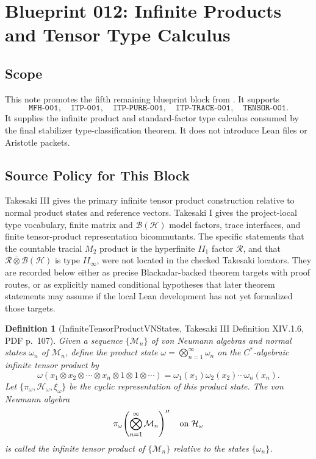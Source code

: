 \documentclass{article}
\newtheorem{definition}{Definition}
\newcommand{\cB}{\mathcal B}
\newcommand{\cH}{\mathcal H}
\newcommand{\cM}{\mathcal M}
\newcommand{\cR}{\mathcal R}
\begin{document}
\section*{Blueprint 012: Infinite Products and Tensor Type Calculus}

\subsection*{Scope}

This note promotes the fifth remaining blueprint block from
.  It supports
\[
  \texttt{MFH-001},\quad
  \texttt{ITP-001},\quad
  \texttt{ITP-PURE-001},\quad
  \texttt{ITP-TRACE-001},\quad
  \texttt{TENSOR-001}.
\]
It supplies the infinite product and standard-factor type calculus consumed by
the final stabilizer type-classification theorem.  It does not introduce Lean
files or Aristotle packets.

\subsection*{Source Policy for This Block}

Takesaki III gives the primary infinite tensor product construction relative to
normal product states and reference vectors.  Takesaki I gives the project-local
type vocabulary, finite matrix and \(\cB(\cH)\) model factors, trace
interfaces, and finite tensor-product representation bicommutants.  The
specific statements that the countable tracial \(M_2\) product is the
hyperfinite \(II_1\) factor \(\cR\), and that
\(\cR\bar\otimes \cB(\cH)\) is type \(II_\infty\), were not located in the
checked Takesaki locators.  They are recorded below either as precise
Blackadar-backed theorem targets with proof routes, or as explicitly named
conditional hypotheses that later theorem statements may assume if the local
Lean development has not yet formalized those targets.

\begin{definition}[InfiniteTensorProductVNStates, Takesaki III Definition XIV.1.6, PDF p.~107]
Given a sequence \(\{\cM_n\}\) of von Neumann algebras and normal states
\(\omega_n\) of \(\cM_n\), define the product state
\(\omega=\bigotimes_{n=1}^{\infty}\omega_n\) on the \(C^*\)-algebraic
infinite tensor product by
\[
  \omega(x_1\otimes x_2\otimes\cdots\otimes x_n\otimes 1\otimes 1\otimes
  \cdots)
  =
  \omega_1(x_1)\omega_2(x_2)\cdots\omega_n(x_n).
\]
Let \(\{\pi_\omega,\cH_\omega,\xi_\omega\}\) be the cyclic representation of
this product state.  The von Neumann algebra
\[
  \pi_\omega\!\left(\bigotimes_{n=1}^{\infty}\cM_n\right)''
  \quad\hbox{on }\cH_\omega
\]
is called the infinite tensor product of \(\{\cM_n\}\) relative to the states
\(\{\omega_n\}\).
\end{definition}
\end{document}
